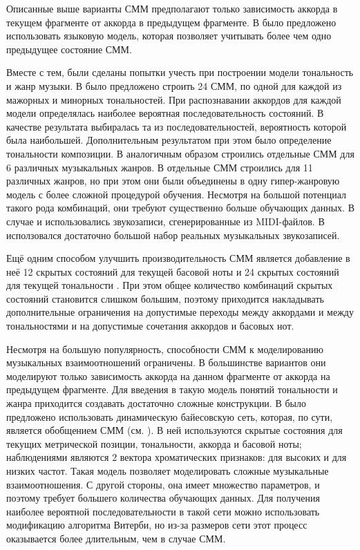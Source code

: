 Описанные выше варианты СММ предполагают только зависимость аккорда в текущем
фрагменте от аккорда в предыдущем фрагменте. В \cite{Khadkevich2009} было
предложено использовать языковую модель, которая позволяет учитывать более чем
одно предыдущее состояние СММ.

Вместе с тем, были сделаны попытки учесть при построении модели тональность и
жанр музыки. В \cite{Lee2007} было предложено строить 24 СММ, по одной для
каждой из мажорных и минорных тональностей. При распознавании аккордов для
каждой модели определялась наиболее вероятная последовательность состояний. В
качестве результата выбиралась та из последовательностей, вероятность которой
была наибольшей. Дополнительным результатом при этом было определение
тональности композиции. В \cite{Lee2008} аналогичным образом строились отдельные
СММ для 6 различных музыкальных жанров. В \cite{Ni2012} отдельные СММ строились
для 11 различных жанров, но при этом они были объединены в одну гипер-жанровую
модель с более сложной процедурой обучения. Несмотря на большой потенциал такого
рода комбинаций, они требуют существенно больше обучающих данных. В случае
\cite{Lee2007} и \cite{Lee2008} использовались звукозаписи, сгенерированные из
MIDI-файлов. В \cite{Ni2012} исползовался достаточно большой набор реальных
музыкальных звукозаписей.

Ещё одним способом улучшить производительность СММ является добавление в неё
12 скрытых состояний для текущей басовой ноты и 24 скрытых состояний для текущей
тональности \cite{Ni2011}. При этом общее количество комбинаций скрытых
состояний становится слишком большим, поэтому приходится накладывать
дополнительные ограничения на допустимые переходы между аккордами и между
тональностями и на допустимые сочетания аккордов и басовых нот.

Несмотря на большую популярность, способности СММ к моделированию музыкальных
взаимоотношений ограничены. В большинстве вариантов они моделируют только
зависимость аккорда на данном фрагменте от аккорда на предыдущем фрагменте. Для
введения в такую модель понятий тональности и жанра приходится создавать
достаточно сложные конструкции. В \cite{Mauch2010} было предложено использовать
динамическую байесовскую сеть, которая, по сути, является обобщением СММ (см.
\cite{Ghahramani2001}). В ней используются скрытые состояния для текущих
метрической позиции, тональности, аккорда и басовой ноты; наблюдениями являются
2 вектора хроматических признаков: для высоких и для низких частот. Такая модель
позволяет моделировать сложные музыкальные взаимоотношения. С другой стороны,
она имеет множество параметров, и поэтому требует большего количества обучающих
данных. Для получения наиболее вероятной последовательности в такой сети можно
использовать модификацию алгоритма Витерби, но из-за размеров сети этот процесс
оказывается более длительным, чем в случае СММ.

